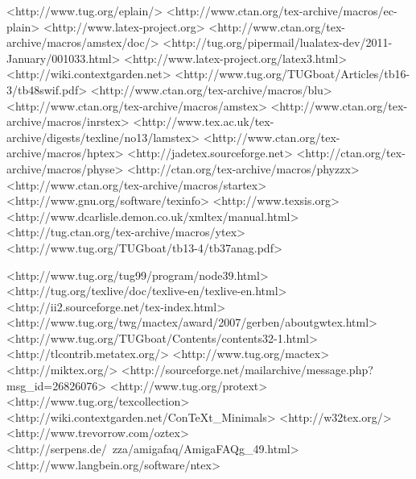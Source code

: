 	<http://www.tug.org/eplain/>
	<http://www.ctan.org/tex-archive/macros/ec-plain>
	<http://www.latex-project.org>
	<http://www.ctan.org/tex-archive/macros/amstex/doc/>
	<http://tug.org/pipermail/lualatex-dev/2011-January/001033.html>
	<http://www.latex-project.org/latex3.html>
	<http://wiki.contextgarden.net>
	<http://www.tug.org/TUGboat/Articles/tb16-3/tb48swif.pdf>
	<http://www.ctan.org/tex-archive/macros/blu>
	<http://www.ctan.org/tex-archive/macros/amstex>
	<http://www.ctan.org/tex-archive/macros/inrstex>
	<http://www.tex.ac.uk/tex-archive/digests/texline/no13/lamstex>
	<http://www.ctan.org/tex-archive/macros/hptex>
	<http://jadetex.sourceforge.net>
	<http://ctan.org/tex-archive/macros/physe>
	<http://ctan.org/tex-archive/macros/phyzzx>
	<http://www.ctan.org/tex-archive/macros/startex>
	<http://www.gnu.org/software/texinfo>
	<http://www.texsis.org>
	<http://www.dcarlisle.demon.co.uk/xmltex/manual.html>
	<http://tug.ctan.org/tex-archive/macros/ytex>
	<http://www.tug.org/TUGboat/tb13-4/tb37anag.pdf>

	<http://www.tug.org/tug99/program/node39.html>
	<http://tug.org/texlive/doc/texlive-en/texlive-en.html>
	<http://ii2.sourceforge.net/tex-index.html>
	<http://www.tug.org/twg/mactex/award/2007/gerben/aboutgwtex.html>
	<http://www.tug.org/TUGboat/Contents/contents32-1.html>
	<http://tlcontrib.metatex.org/>
	<http://www.tug.org/mactex>
	<http://miktex.org/>
	<http://sourceforge.net/mailarchive/message.php?msg_id=26826076>
	<http://www.tug.org/protext>
	<http://www.tug.org/texcollection>
	<http://wiki.contextgarden.net/ConTeXt_Minimals>
	<http://w32tex.org/>
	<http://www.trevorrow.com/oztex>
	<http://serpens.de/~zza/amigafaq/AmigaFAQg_49.html>
	<http://www.langbein.org/software/ntex>

